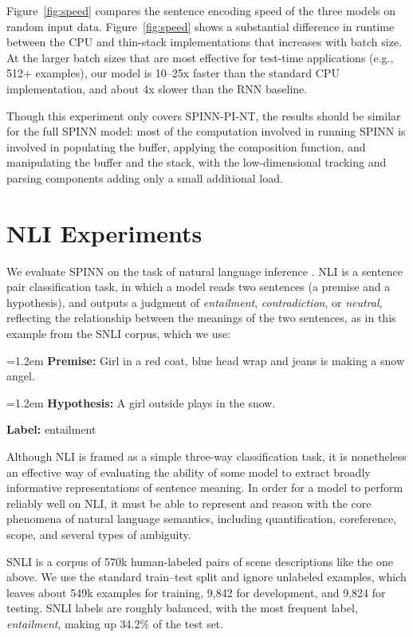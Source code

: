 \documentclass[11pt]{article}
\newcommand{\snli}[3]{{\vspace{0.25em}
{\small \setlength{\parindent}{0.6em} \hangindent=1.2em  \textbf{Premise:} #1\par}\vspace{0.25em}
{\small \setlength{\parindent}{0.6em} \hangindent=1.2em   \textbf{Hypothesis:} #2\par}\vspace{0.25em}
{\small \setlength{\parindent}{0.6em}  \textbf{Label:} #3\par}
}}
\begin{document}
Figure~\ref{fig:speed} compares the sentence encoding speed of the three models on random input data. Figure~\ref{fig:speed} shows a substantial difference in runtime between the CPU and thin-stack implementations that increases with batch size. At the larger batch sizes that are most effective for test-time applications (e.g., 512+ examples), our model is 10--25x faster than the standard CPU implementation, and about 4x slower than the RNN baseline.

Though this experiment only covers SPINN-PI-NT, the results should be similar for the full SPINN model: most of the computation involved in running SPINN is involved in populating the buffer, applying the composition function, and manipulating the buffer and the stack, with the low-dimensional tracking and parsing components adding only a small additional load.

\section{NLI Experiments}

We evaluate SPINN on the task of natural language inference \citep[NLI, a.k.a.\ recognizing textual entailment, or RTE;][]{dagan2006pascal}. NLI is a sentence pair classification task, in which a model reads two sentences (a premise and a hypothesis), and outputs a judgment of {\it entailment}, {\it contradiction}, or {\it neutral}, reflecting the relationship between the meanings of the two sentences, as in this example from the SNLI corpus, which we use: 

\snli{Girl in a red coat, blue head wrap and jeans is making a snow angel.}
{A girl outside plays in the snow.}
{entailment}

Although NLI is framed as a simple three-way classification task, it is nonetheless an effective way of evaluating the ability of some model to extract broadly informative representations of sentence meaning. In order for a model to perform reliably well on NLI, it must be able to represent and reason with the core phenomena of natural language semantics, including quantification, coreference, scope, and several types of ambiguity.

SNLI is a corpus of 570k human-labeled pairs of scene descriptions like the one above. We use the standard train--test split and ignore unlabeled examples, which leaves about 549k examples for training, 9,842 for development, and 9,824 for testing. SNLI labels are roughly balanced, with the most frequent label, {\it entailment}, making up 34.2\% of the test set.
\end{document}
